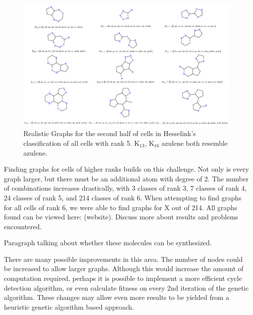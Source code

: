 \documentclass[12pt]{article}
\begin{document}
\begin{figure}[ht!]
\centering
\includegraphics[width=160mm]{rank5Results2.png}
\caption{Realistic Graphs for the second half of cells in Hesselink's classification of all cells with rank 5. K$_{13}$, K$_{16}$ azulene both resemble azulene.}
\label{fig:rank5Results2}
\end{figure}

Finding graphs for cells of higher ranks builds on this challenge. Not only is every graph larger, but there must be an additional atom with degree of 2. The number of combinations increases drastically, with 3 classes of rank 3, 7 classes of rank 4, 24 classes of rank 5, and 214 classes of rank 6. When attempting to find graphs for all cells of rank 6, we were able to find graphs for X out of 214. All graphs found can be viewed here: (website). Discuss more about results and problems encountered.

Paragraph talking about whether these molecules can be synthesized.

There are many possible improvements in this area. The number of nodes could be increased to allow larger graphs. Although this would increase the amount of computation required, perhaps it is possible to implement a more efficient cycle detection algorithm, or even calculate fitness on every 2nd iteration of the genetic algorithm. These changes may allow even more results to be yielded from a heuristic genetic algorithm based approach.

\end{document}
